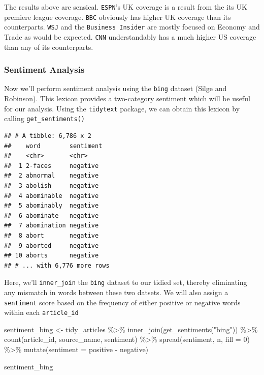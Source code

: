 \documentclass[
]{article}
\newenvironment{Shaded}{\begin{snugshade}}{\end{snugshade}}
\newcommand{\AttributeTok}[1]{\textcolor[rgb]{0.77,0.63,0.00}{#1}}
\newcommand{\DecValTok}[1]{\textcolor[rgb]{0.00,0.00,0.81}{#1}}
\newcommand{\FunctionTok}[1]{\textcolor[rgb]{0.00,0.00,0.00}{#1}}
\newcommand{\NormalTok}[1]{#1}
\newcommand{\OtherTok}[1]{\textcolor[rgb]{0.56,0.35,0.01}{#1}}
\newcommand{\SpecialCharTok}[1]{\textcolor[rgb]{0.00,0.00,0.00}{#1}}
\newcommand{\StringTok}[1]{\textcolor[rgb]{0.31,0.60,0.02}{#1}}
\begin{document}
The results above are sensical. \texttt{ESPN}'s UK coverage is a result
from the its UK premiere league coverage. \texttt{BBC} obviously has
higher UK coverage than its counterparts. \texttt{WSJ} and the
\texttt{Business\ Insider} are mostly focused on Economy and Trade as
would be expected. \texttt{CNN} understandably has a much higher US
coverage than any of its counterparts.

\hypertarget{sentiment-analysis}{%
\subsubsection{Sentiment Analysis}\label{sentiment-analysis}}

Now we'll perform sentiment analysis using the \texttt{bing} dataset
(Silge and Robinson). This lexicon provides a two-category sentiment
which will be useful for our analysis. Using the \texttt{tidytext}
package, we can obtain this lexicon by calling
\texttt{get\_sentiments()}

\begin{verbatim}
## # A tibble: 6,786 x 2
##    word        sentiment
##    <chr>       <chr>    
##  1 2-faces     negative 
##  2 abnormal    negative 
##  3 abolish     negative 
##  4 abominable  negative 
##  5 abominably  negative 
##  6 abominate   negative 
##  7 abomination negative 
##  8 abort       negative 
##  9 aborted     negative 
## 10 aborts      negative 
## # ... with 6,776 more rows
\end{verbatim}

Here, we'll \texttt{inner\_join} the \texttt{bing} dataset to our tidied
set, thereby eliminating any mismatch in words between these two
datsets. We will also assign a \texttt{sentiment} score based on the
frequency of either positive or negative words within each
\texttt{article\_id}

\begin{Shaded}
\begin{Highlighting}[]
\NormalTok{sentiment\_bing }\OtherTok{\textless{}{-}}\NormalTok{ tidy\_articles }\SpecialCharTok{\%\textgreater{}\%}
  \FunctionTok{inner\_join}\NormalTok{(}\FunctionTok{get\_sentiments}\NormalTok{(}\StringTok{"bing"}\NormalTok{)) }\SpecialCharTok{\%\textgreater{}\%}
  \FunctionTok{count}\NormalTok{(article\_id, source\_name, sentiment) }\SpecialCharTok{\%\textgreater{}\%}
  \FunctionTok{spread}\NormalTok{(sentiment, n, }\AttributeTok{fill =} \DecValTok{0}\NormalTok{) }\SpecialCharTok{\%\textgreater{}\%}
  \FunctionTok{mutate}\NormalTok{(}\AttributeTok{sentiment =}\NormalTok{ positive }\SpecialCharTok{{-}}\NormalTok{ negative)}

\NormalTok{sentiment\_bing}
\end{Highlighting}
\end{Shaded}
\end{document}
